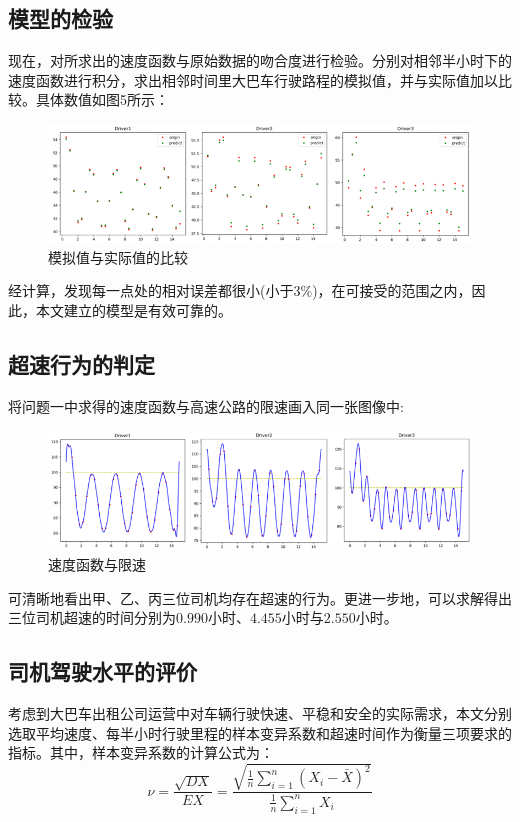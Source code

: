 \documentclass[bwprint]{cumcmthesis}
\begin{document}
        \subsection{模型的检验}
            现在，对所求出的速度函数与原始数据的吻合度进行检验。分别对相邻半小时下的速度函数进行积分，求出相邻时间里大巴车行驶路程的模拟值，并与实际值加以比较。具体数值如图5所示：
            \begin{figure}[htbp]
                \centering
                \includegraphics[width=1\linewidth]{compare.png}
                \caption{模拟值与实际值的比较}
            \end{figure}

            经计算，发现每一点处的相对误差都很小(小于$3\%$)，在可接受的范围之内，因此，本文建立的模型是有效可靠的。
        
        \subsection{超速行为的判定}
        将问题一中求得的速度函数与高速公路的限速画入同一张图像中:
        \begin{figure}[htbp]
            \centering
            \includegraphics[width=1\linewidth]{v100.png}
            \caption{速度函数与限速}
        \end{figure}

        可清晰地看出甲、乙、丙三位司机均存在超速的行为。更进一步地，可以求解得出三位司机超速的时间分别为$0.990$小时、$4.455$小时与$2.550$小时。

        \subsection{司机驾驶水平的评价}
        考虑到大巴车出租公司运营中对车辆行驶快速、平稳和安全的实际需求，本文分别选取平均速度、每半小时行驶里程的样本变异系数和超速时间作为衡量三项要求的指标。其中，样本变异系数的计算公式为：
        \begin{equation*}
            \nu = \frac{\sqrt{DX}}{EX} = \frac{\sqrt{\frac{1}{n}\sum_{i=1}^{n}\left(X_i-\bar{X}\right)^2}}{\frac{1}{n}\sum_{i=1}^{n}X_i}
        \end{equation*}
\end{document}
